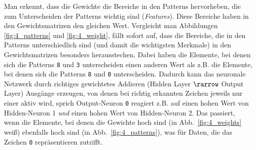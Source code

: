 Man erkennt, dass die Gewichte die Bereiche in den Patterns hervorheben, die zum Unterscheiden der Patterns wichtig sind (\emph{Features}). Diese Bereiche haben in den Gewichtsmatrizen den gleichen Wert. Vergleicht man Abbildungen \ref{fig:4_patterns} und \ref{fig:4_weight}, fällt sofort auf, dass die Bereiche, die in den Patterns unterschiedlich sind (und damit die wichtigsten Merkmale) in den Gewichtsmatrizen besonders herausstechen. Dabei haben die Elemente, bei denen sich die Patterns \texttt{8} und \texttt{3} unterscheiden einen anderen Wert als z.B. die Elemente, bei denen sich die Patterns \texttt{8} und \texttt{0} unterscheiden. Dadurch kann das neuronale Netzwerk durch richtiges gewichtetes Addieren (Hidden Layer $\rarrow$ Output Layer) Ausgänge erzeugen, von denen bei richtig erkannten Zeichen jeweils nur einer aktiv wird, sprich Output-Neuron \texttt{0} reagiert z.B. auf einen hohen Wert von Hidden-Neuron 1 \emph{und} einen hohen Wert von Hidden-Neuron 2. Das passiert, wenn die Elemente, bei denen die Gewichte hoch sind (in Abb.~\ref{fig:4_weights} weiß) ebenfalls hoch sind (in Abb.~\ref{fig:4_patterns}), was für Daten, die das Zeichen \texttt{0} repräsentieren zutrifft.

